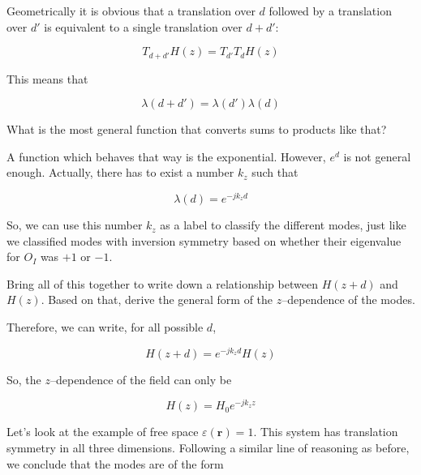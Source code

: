Geometrically it is obvious that a translation over $d$ followed by a translation over $d'$ is equivalent to a single translation over $d+d'$:

\begin{equation}
T_{d+d'}H(z) = T_{d'}T_{d}H(z)
\end{equation} 

This means that

\begin{equation}
\lambda(d + d')=\lambda(d')\lambda(d)
\end{equation} 

\begin{cue}
What is the most general function that converts sums to products like that?
\end{cue}

\noindent{}A function which behaves that way is the exponential. However, $e^d$ is not general enough. Actually, there has to exist a number $k_z$ such that

\begin{equation}
\lambda(d) = e^{-j k_z d}
\end{equation} 

So, we can use this number $k_z$ as a label to classify the different modes, just like we classified modes with inversion symmetry based on whether their eigenvalue for $O_I$ was $+1$ or $-1$.

\begin{cue}
Bring all of this together to write down a relationship between $H(z + d)$ and $H(z)$. Based on that, derive the general form of the  $z$--dependence of the modes. 
\end{cue}

Therefore, we can write, for all possible $d$, 

\begin{equation}
H(z + d) = e^{-j k_z d}H(z) \label{eq-bloch-degenerate}
\end{equation} 

So, the $z$--dependence of the field can only be

\begin{equation}
H(z) = H_0 e^{-j k_z z}
\end{equation} 

Let's look at the example of free space $\varepsilon({\mathbf r})=1$. This system has translation symmetry in all three dimensions. Following a similar line of reasoning as before, we conclude that the modes are of the form

